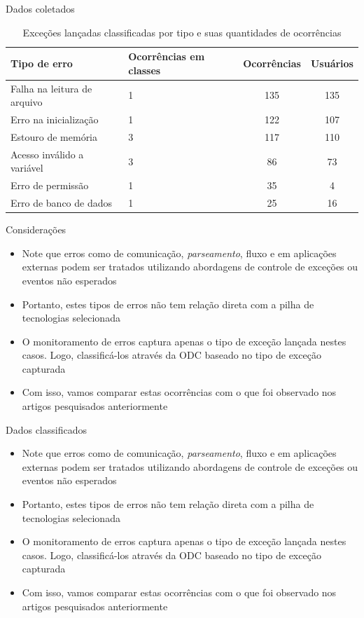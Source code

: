 \documentclass[brazilian]{beamer}
\begin{document}
\begin{frame}{Dados coletados}
    \begin{table}[H]
        \centering
        \begin{tabularx}{\textwidth}{ l|X|c|c }
            \textbf{Tipo de erro} & \textbf{Ocorrências em classes} & \textbf{Ocorrências} & \textbf{Usuários} \\
            \hline
            Falha na leitura de arquivo & 1 & 135 & 135 \\
            Erro na inicialização & 1 & 122 & 107 \\
            Estouro de memória & 3 & 117 & 110 \\
            Acesso inválido a variável & 3 & 86 & 73 \\
            Erro de permissão & 1 & 35 & 4 \\
            Erro de banco de dados & 1 & 25 & 16 \\
        \end{tabularx}
        \caption{Exceções lançadas classificadas por tipo e suas quantidades de ocorrências}
        \label{table:exceptions_classification}
    \end{table}
\end{frame}

\begin{frame}{Considerações}
    \begin{itemize}
        \item Note que erros como de comunicação, \textit{parseamento}, fluxo e em aplicações externas podem ser tratados utilizando abordagens de controle de exceções ou eventos não esperados
        \item Portanto, estes tipos de erros não tem relação direta com a pilha de tecnologias selecionada
        \item O monitoramento de erros captura apenas o tipo de exceção lançada nestes casos. Logo, classificá-los através da ODC baseado no tipo de exceção capturada
        \item Com isso, vamos comparar estas ocorrências com o que foi observado nos artigos pesquisados anteriormente
    \end{itemize}
\end{frame}

\begin{frame}{Dados classificados}
    \begin{itemize}
        \item Note que erros como de comunicação, \textit{parseamento}, fluxo e em aplicações externas podem ser tratados utilizando abordagens de controle de exceções ou eventos não esperados
        \item Portanto, estes tipos de erros não tem relação direta com a pilha de tecnologias selecionada
        \item O monitoramento de erros captura apenas o tipo de exceção lançada nestes casos. Logo, classificá-los através da ODC baseado no tipo de exceção capturada
        \item Com isso, vamos comparar estas ocorrências com o que foi observado nos artigos pesquisados anteriormente
    \end{itemize}
\end{frame}
\end{document}
